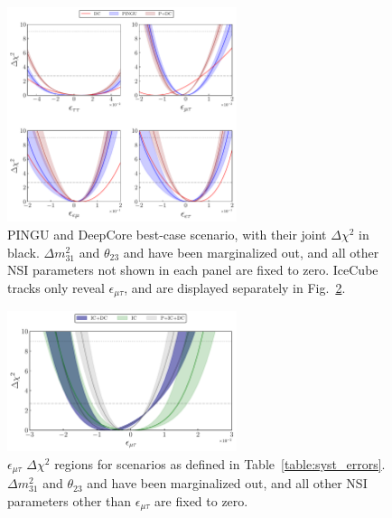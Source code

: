 \documentclass[draft=True]{revtex4-2}
\newcommand{\emt}{\ensuremath{\epsilon_{\mu\tau}}}
\newcommand{\dm}{\Delta m^2_{31}}
\begin{document}
{\begin{figure}
   \begin{center}
      \includegraphics[width=0.6\textwidth]{figures/joint_3D_NO.pdf}
      \caption{PINGU and DeepCore best-case scenario, with their joint $\Delta \chi^2$ in black. $\dm$ and $\theta_{23}$ and have been marginalized out, and all other NSI 
      parameters not shown in each panel are fixed to zero. 
      IceCube tracks only reveal $\emt$, and are displayed separately in Fig.~\ref{fig:IC_3D}.}\label{fig:3D_NO}
   \end{center}
\end{figure} 
\begin{figure}
   \begin{center} 
      \includegraphics[width=0.6\textwidth]{figures/PID_3D_emt.pdf}
      \caption{$\emt$ $\Delta \chi^2$ regions for scenarios as defined in Table~\ref{table:syst_errors}.
    $\dm$ and $\theta_{23}$ and have been marginalized out, and all other NSI 
    parameters other than $\emt$ are fixed to zero.}\label{fig:IC_3D}
   \end{center}
\end{figure}

}
\end{document}
